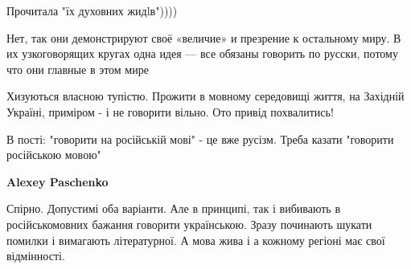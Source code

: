 \begin{itemize}


 
Прочитала "їх духовних жидlв"))))

 

Нет, так они демонстрируют своё «величие» и презрение к остальному миру. В их
узкоговорящих кругах одна идея — все обязаны говорить по русски, потому что они
главные в этом мире


 

Хизуються власною тупістю. Прожити в мовному середовищі життя, на Західній
Україні, приміром - і не говорити вільно. Ото привід похвалитись!

 

В пості: "говорити на російській мові" - це вже русізм. Треба казати "говорити
російською мовою"

\begin{itemize}
 
\textbf{Alexey Paschenko} 

Спірно. Допустимі оба варіанти. Але в принципі, так і вибивають в
російськомовних бажання говорити українською. Зразу починають шукати помилки і
вимагають літературної. А мова жива і а кожному регіоні має свої відмінності.


 

\end{itemize}
\end{itemize}
